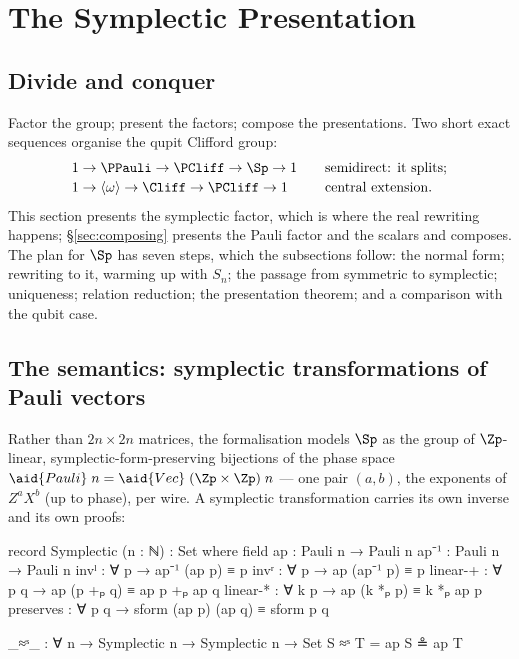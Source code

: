 \section{The Symplectic Presentation}\label{sec:symplectic}

\subsection{Divide and conquer}

Factor the group; present the factors; compose the presentations.  Two
short exact sequences organise the qupit Clifford group:
\[
  \begin{array}{l@{\qquad}l}
  1 \to \PPauli \to \PCliff \to \Sp \to 1 & \text{semidirect: it splits;}\\[2pt]
  1 \to \langle\omega\rangle \to \Cliff \to \PCliff \to 1 & \text{central extension.}
  \end{array}
\]
This section presents the symplectic factor, which is where the real
rewriting happens; \S\ref{sec:composing} presents the Pauli factor and
the scalars and composes.  The plan for $\Sp$ has seven steps, which the
subsections follow: the normal form; rewriting to it, warming up with
$S_n$; the passage from symmetric to symplectic; uniqueness; relation
reduction; the presentation theorem; and a comparison with the qubit
case.

\subsection{The semantics: symplectic transformations of Pauli vectors}\label{sec:spsem}

Rather than $2n \times 2n$ matrices, the formalisation models $\Sp$ as
the group of $\Zp$-linear, symplectic-form-preserving bijections of the
phase space $\aid{Pauli}\;n = \aid{Vec}\;(\Zp \times \Zp)\;n$ --- one
pair $(a,b)$, the exponents of $Z^{a}X^{b}$ (up to phase), per wire.
A symplectic transformation carries its own inverse and its own proofs:

\begin{agdacode}
record Symplectic (n : ℕ) : Set where
  field
    ap        : Pauli n → Pauli n
    ap⁻¹      : Pauli n → Pauli n
    invˡ      : ∀ p → ap⁻¹ (ap p) ≡ p
    invʳ      : ∀ p → ap (ap⁻¹ p) ≡ p
    linear-+  : ∀ p q → ap (p +ₚ q) ≡ ap p +ₚ ap q
    linear-*  : ∀ k p → ap (k *ₚ p) ≡ k *ₚ ap p
    preserves : ∀ p q → sform (ap p) (ap q) ≡ sform p q

_≈ˢ_ : ∀ {n} → Symplectic n → Symplectic n → Set
S ≈ˢ T = ap S ≗ ap T
\end{agdacode}

